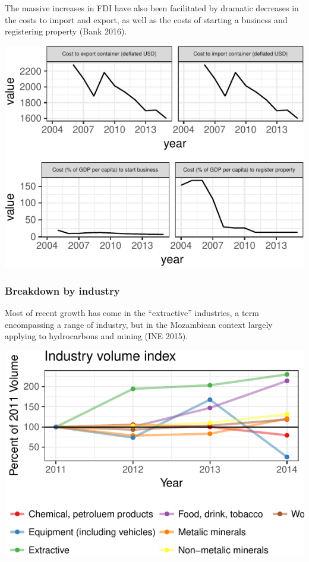 \documentclass[]{elsarticle} %
\begin{document}
The massive increases in FDI have also been facilitated by dramatic
decreases in the costs to import and export, as well as the costs of
starting a business and registering property (Bank 2016).

\begin{center}\includegraphics{paper_files/figure-latex/unnamed-chunk-7-1} \end{center}

\subsubsection{Breakdown by industry}\label{breakdown-by-industry}

Most of recent growth has come in the ``extractive'' industries, a term
encompassing a range of industry, but in the Mozambican context largely
applying to hydrocarbons and mining (INE 2015).

\begin{center}\includegraphics{paper_files/figure-latex/unnamed-chunk-8-1} \end{center}
\end{document}
